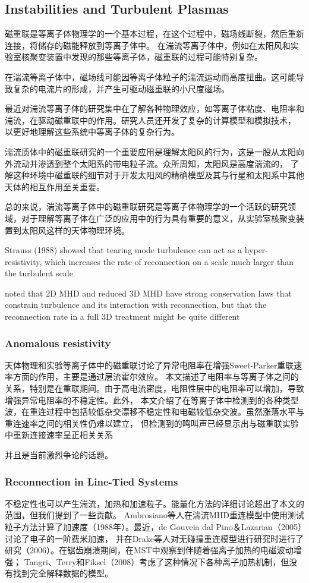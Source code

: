 \documentclass[12pt, a4paper, oneside]{article}
\begin{document}
\begin{spacing}{2.0}
\subsection{Instabilities and Turbulent Plasmas}
磁重联是等离子体物理学的一个基本过程，在这个过程中，磁场线断裂，然后重新连接，将储存的磁能释放到等离子体中。
在湍流等离子体中，例如在太阳风和实验室核聚变装置中发现的那些等离子体，磁重联的过程可能特别复杂。

在湍流等离子体中，磁场线可能因等离子体粒子的湍流运动而高度扭曲。这可能导致复杂的电流片的形成，并产生可驱动磁重联的小尺度磁场。

最近对湍流等离子体的研究集中在了解各种物理效应，如等离子体粘度、电阻率和湍流，在驱动磁重联中的作用。研究人员还开发了复杂的计算模型和模拟技术，
以更好地理解这些系统中等离子体的复杂行为。

湍流质体中的磁重联研究的一个重要应用是理解太阳风的行为，这是一股从太阳向外流动并渗透到整个太阳系的带电粒子流。众所周知，太阳风是高度湍流的，
了解这种环境中磁重联的细节对于开发太阳风的精确模型及其与行星和太阳系中其他天体的相互作用至关重要。

总的来说，湍流等离子体中的磁重联研究是等离子体物理学的一个活跃的研究领域，对于理解等离子体在广泛的应用中的行为具有重要的意义，从实验室核聚变装置到太阳风这样的天体物理环境。

Strauss (1988) showed that tearing mode turbulence
can act as a hyper-resistivity, which increases the rate of reconnection on a scale much larger than
the turbulent scale. 

noted that 2D MHD and reduced 3D MHD have
strong conservation laws that constrain turbulence and its interaction with reconnection, but that
the reconnection rate in a full 3D treatment might be quite different


\subsubsection{Anomalous resistivity}
天体物理和实验等离子体中的磁重联讨论了异常电阻率在增强Sweet-Parker重联速率方面的作用，主要是通过层流霍尔效应。
本文描述了电阻率与等离子体之间的关系，特别是在重联期间。由于高电流密度，电阻性层中的电阻率可以增加，导致增强异常电阻率的不稳定性。此外，
本文介绍了在等离子体中检测到的各种类型波，在重连过程中包括较低杂交漂移不稳定性和电磁较低杂交波。虽然涨落水平与重连速率之间的相关性仍难以建立，
但检测到的鸣叫声已经显示出与磁重联实验中重新连接速率呈正相关关系

并且是当前激烈争论的话题。
\subsubsection{Reconnection in Line-Tied Systems}
不稳定性也可以产生湍流，加热和加速粒子。能量化方法的详细讨论超出了本文的范围，但我们提到了一些贡献。
Ambrosiano等人在湍流MHD重连模型中使用测试粒子方法计算了加速度（1988年）。最近，de Gouveia dal Pino＆Lazarian（2005）讨论了电子的一阶费米加速，
并在Drake等人对无碰撞重连模型进行研究时进行了研究（2006）。在锯齿崩溃期间，在MST中观察到伴随着强离子加热的电磁波动增强；
Tangri、Terry和Fiksel（2008）考虑了这种情况下各种离子加热机制，但没有找到完全解释数据的模型。


\end{spacing}
\end{document}
